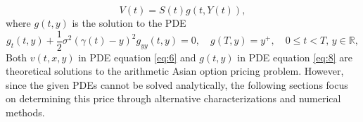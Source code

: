 \begin{equation}
    V(t) = S(t)g(t, Y(t)),
\end{equation}
where $g(t, y)$ is the solution to the PDE
\begin{equation}
    g_t(t, y) + \frac{1}{2} \sigma^2 \left( \gamma(t) - y \right)^2 g_{yy}(t, y) = 0,\quad g(T, y) = y^+,\quad 0 \leq t < T, \, y \in \mathbb{R}, \label{eq:8}
\end{equation}
Both \(v(t, x, y)\) in PDE equation \eqref{eq:6} and \(g(t, y)\) in PDE equation \eqref{eq:8} are theoretical solutions to the arithmetic Asian option pricing problem. However, since the given PDEs cannot be solved analytically, the following sections focus on determining this price through alternative characterizations and numerical methods.